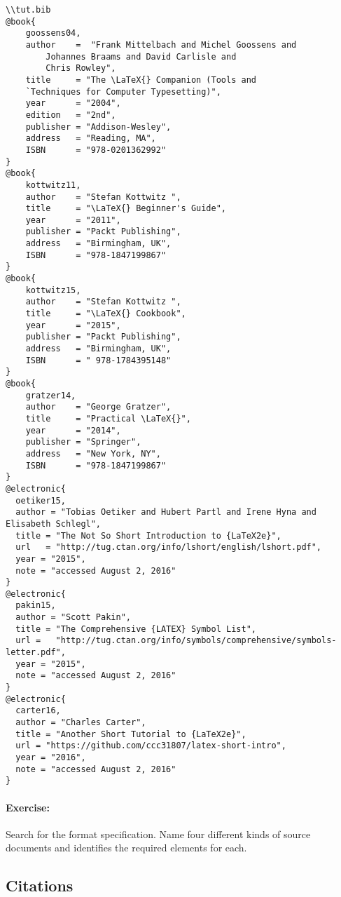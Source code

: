         \begin{verbatim}
\\tut.bib
@book{
    goossens04,
    author    =  "Frank Mittelbach and Michel Goossens and 
        Johannes Braams and David Carlisle and 
        Chris Rowley",
    title     = "The \LaTeX{} Companion (Tools and 
    `Techniques for Computer Typesetting)",
    year      = "2004",
    edition   = "2nd",
    publisher = "Addison-Wesley",
    address   = "Reading, MA",
    ISBN      = "978-0201362992"
}
@book{
    kottwitz11,
    author    = "Stefan Kottwitz ",
    title     = "\LaTeX{} Beginner's Guide",
    year      = "2011",
    publisher = "Packt Publishing",
    address   = "Birmingham, UK",
    ISBN      = "978-1847199867"
}
@book{
    kottwitz15,
    author    = "Stefan Kottwitz ",
    title     = "\LaTeX{} Cookbook",
    year      = "2015",
    publisher = "Packt Publishing",
    address   = "Birmingham, UK",
    ISBN      = " 978-1784395148"
}
@book{
    gratzer14,
    author    = "George Gratzer",
    title     = "Practical \LaTeX{}",
    year      = "2014",
    publisher = "Springer",
    address   = "New York, NY",
    ISBN      = "978-1847199867"
}
@electronic{
  oetiker15,
  author = "Tobias Oetiker and Hubert Partl and Irene Hyna and Elisabeth Schlegl",
  title = "The Not So Short Introduction to {LaTeX2e}",
  url   = "http://tug.ctan.org/info/lshort/english/lshort.pdf",
  year = "2015", 
  note = "accessed August 2, 2016"
}
@electronic{
  pakin15,
  author = "Scott Pakin",
  title = "The Comprehensive {LATEX} Symbol List",
  url =   "http://tug.ctan.org/info/symbols/comprehensive/symbols-letter.pdf",
  year = "2015", 
  note = "accessed August 2, 2016"
}
@electronic{
  carter16,
  author = "Charles Carter",
  title = "Another Short Tutorial to {LaTeX2e}",
  url = "https://github.com/ccc31807/latex-short-intro",
  year = "2016", 
  note = "accessed August 2, 2016"
}
        \end{verbatim}

        \paragraph{Exercise:} Search for the \bib{} format specification. Name four different kinds of source documents and identifies the required elements for each.

    \subsection{Citations}
    \label{Citations}
        
